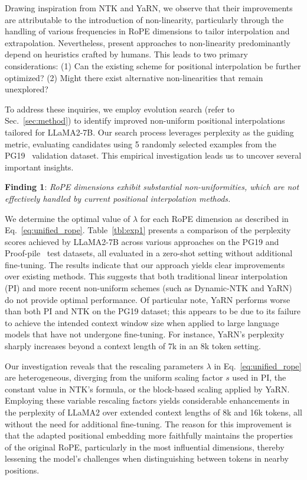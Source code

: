 Drawing inspiration from NTK and YaRN, we observe that their improvements are attributable to the introduction of non-linearity, particularly through the handling of various frequencies in RoPE dimensions to tailor interpolation and extrapolation. Nevertheless, present approaches to non-linearity predominantly depend on heuristics crafted by humans. This leads to two primary considerations: (1) Can the existing scheme for positional interpolation be further optimized? (2) Might there exist alternative non-linearities that remain unexplored?

To address these inquiries, we employ evolution search (refer to Sec.~\ref{sec:method}) to identify improved non-uniform positional interpolations tailored for LLaMA2-7B. Our search process leverages perplexity as the guiding metric, evaluating candidates using 5 randomly selected examples from the PG19~\cite{pg19} validation dataset. This empirical investigation leads us to uncover several important insights.

\textbf{Finding 1}: \textit{RoPE dimensions exhibit substantial non-uniformities, which are not effectively handled by current positional interpolation methods.}

We determine the optimal value of $\lambda$ for each RoPE dimension as described in Eq.~\ref{eq:unified_rope}. Table~\ref{tbl:exp1} presents a comparison of the perplexity scores achieved by LLaMA2-7B across various approaches on the PG19 and Proof-pile~\cite{proof-pile} test datasets, all evaluated in a zero-shot setting without additional fine-tuning. The results indicate that our approach yields clear improvements over existing methods. This suggests that both traditional linear interpolation (PI) and more recent non-uniform schemes (such as Dynamic-NTK and YaRN) do not provide optimal performance. Of particular note, YaRN performs worse than both PI and NTK on the PG19 dataset; this appears to be due to its failure to achieve the intended context window size when applied to large language models that have not undergone fine-tuning. For instance, YaRN's perplexity sharply increases beyond a context length of 7k in an 8k token setting.

Our investigation reveals that the rescaling parameters $\lambda$ in Eq.~\ref{eq:unified_rope} are heterogeneous, diverging from the uniform scaling factor $s$ used in PI, the constant value in NTK’s formula, or the block-based scaling applied by YaRN. Employing these variable rescaling factors yields considerable enhancements in the perplexity of LLaMA2 over extended context lengths of 8k and 16k tokens, all without the need for additional fine-tuning. The reason for this improvement is that the adapted positional embedding more faithfully maintains the properties of the original RoPE, particularly in the most influential dimensions, thereby lessening the model’s challenges when distinguishing between tokens in nearby positions.

